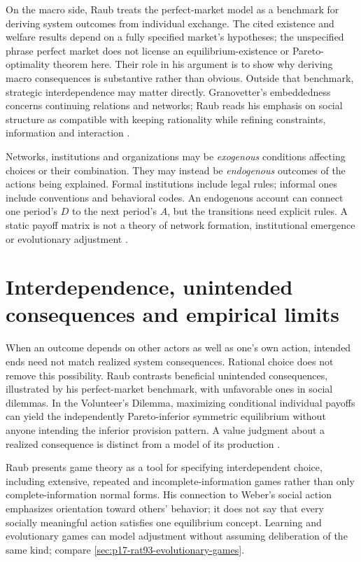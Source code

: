 On the macro side, Raub treats the perfect-market model as a benchmark for
deriving system outcomes from individual exchange. The cited existence and
welfare results depend on a fully specified market's hypotheses; the
unspecified phrase perfect market does not license an equilibrium-existence
or Pareto-optimality theorem here. Their role in his argument is to show
why deriving macro consequences is substantive rather than obvious. Outside
that benchmark, strategic interdependence may matter directly.
Granovetter's embeddedness concerns continuing relations and networks;
Raub reads his emphasis on social structure as compatible with keeping
rationality while refining constraints, information and interaction
\parencite[pp.~617--618]{Raub2021RationalChoiceSocialSciences}.

Networks, institutions and organizations may be \emph{exogenous} conditions
affecting choices or their combination. They may instead be \emph{endogenous}
outcomes of the actions being explained. Formal institutions include legal
rules; informal ones include conventions and behavioral codes. An endogenous
account can connect one period's \(D\) to the next period's \(A\), but
the transitions need explicit rules. A static payoff matrix is not a theory
of network formation, institutional emergence or evolutionary adjustment
\parencite[p.~618]{Raub2021RationalChoiceSocialSciences}.

\section{Interdependence, unintended consequences and empirical limits}
\label{sec:p17-rat104-evidence}

When an outcome depends on other actors as well as one's own action, intended
ends need not match realized system consequences. Rational choice does not
remove this possibility. Raub contrasts beneficial unintended consequences,
illustrated by his perfect-market benchmark, with unfavorable ones in social
dilemmas. In the Volunteer's Dilemma, maximizing conditional individual
payoffs can yield the independently Pareto-inferior symmetric equilibrium
without anyone intending the inferior provision pattern. A value judgment
about a realized consequence is distinct from a model of its production
\parencite[pp.~618--619]{Raub2021RationalChoiceSocialSciences}.

Raub presents game theory as a tool for specifying interdependent choice,
including extensive, repeated and incomplete-information games rather than
only complete-information normal forms. His connection to Weber's social
action emphasizes orientation toward others' behavior; it does not say
that every socially meaningful action satisfies one equilibrium concept.
Learning and evolutionary games can model adjustment without assuming
deliberation of the same kind; compare
\cref{sec:p17-rat93-evolutionary-games}.

